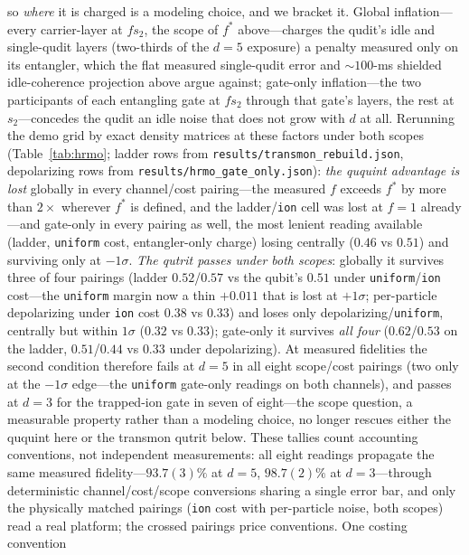 \documentclass[aps,pra,reprint,superscriptaddress,nofootinbib,floatfix]{revtex4-2}
\begin{document}
so \emph{where} it is charged is a modeling choice, and we bracket
it. Global inflation---every carrier-layer at $f s_2$, the scope of
$f^\ast$ above---charges the qudit's idle and single-qudit layers
(two-thirds of the $d=5$ exposure) a penalty measured only on its
entangler, which the flat measured single-qudit error and
${\sim}100$-ms shielded idle-coherence projection above argue against;
gate-only inflation---the two participants of each entangling gate
at $f s_2$ through that gate's layers, the rest at
$s_2$---concedes the qudit an idle noise that does not grow with
$d$ at all. Rerunning the demo grid by exact density
matrices at these factors under both scopes
(Table~\ref{tab:hrmo}; ladder rows from
\texttt{results/transmon\_rebuild.json}, depolarizing rows from
\texttt{results/hrmo\_gate\_only.json}): \emph{the ququint
advantage is lost} globally in every channel/cost pairing---the
measured $f$ exceeds $f^\ast$ by more than $2\times$
wherever $f^\ast$ is defined, and the ladder/\texttt{ion} cell was
lost at $f=1$ already---and gate-only in every pairing as well,
the most lenient reading available (ladder,
\texttt{uniform} cost, entangler-only charge) losing
centrally ($0.46$ vs $0.51$) and surviving only at $-1\sigma$.
\emph{The qutrit
passes under both scopes}: globally it survives three of four
pairings (ladder $0.52$/$0.57$ vs the qubit's $0.51$ under
\texttt{uniform}/\texttt{ion} cost---the \texttt{uniform} margin
now a thin $+0.011$ that is lost at $+1\sigma$; per-particle
depolarizing
under \texttt{ion} cost $0.38$ vs $0.33$) and loses only
depolarizing/\texttt{uniform}, centrally but within $1\sigma$
($0.32$ vs $0.33$); gate-only it survives \emph{all four}
($0.62$/$0.53$ on the ladder, $0.51$/$0.44$ vs $0.33$ under
depolarizing). At measured fidelities the second condition
therefore fails at $d=5$ in all eight scope/cost pairings
(two only at the $-1\sigma$ edge---the \texttt{uniform} gate-only
readings on both channels), and passes at $d=3$ for the
trapped-ion
gate in seven of eight---the scope question, a measurable property
rather than a modeling choice, no longer rescues either the ququint
here or the transmon qutrit below. These tallies count accounting
conventions, not independent measurements: all eight readings
propagate the same measured fidelity---$93.7(3)\%$ at $d=5$,
$98.7(2)\%$ at $d=3$---through deterministic channel/cost/scope
conversions sharing a single error bar, and only the physically
matched pairings (\texttt{ion} cost with per-particle noise, both
scopes) read a real platform; the crossed pairings price
conventions. One costing convention
\end{document}
